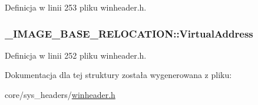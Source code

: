 Definicja w linii 253 pliku winheader.\-h.

\hypertarget{struct___i_m_a_g_e___b_a_s_e___r_e_l_o_c_a_t_i_o_n_aa9cd235a62c0b36e0b9f7051be3c5dcb}{
\subsubsection[{Virtual\-Address}]{ \-\_\-\-I\-M\-A\-G\-E\-\_\-\-B\-A\-S\-E\-\_\-\-R\-E\-L\-O\-C\-A\-T\-I\-O\-N\-::\-Virtual\-Address}}\label{struct___i_m_a_g_e___b_a_s_e___r_e_l_o_c_a_t_i_o_n_aa9cd235a62c0b36e0b9f7051be3c5dcb}


Definicja w linii 252 pliku winheader.\-h.



Dokumentacja dla tej struktury została wygenerowana z pliku\-:\begin{DoxyCompactItemize}
\item 
core/sys\-\_\-headers/\hyperlink{winheader_8h}{winheader.\-h}\end{DoxyCompactItemize}
